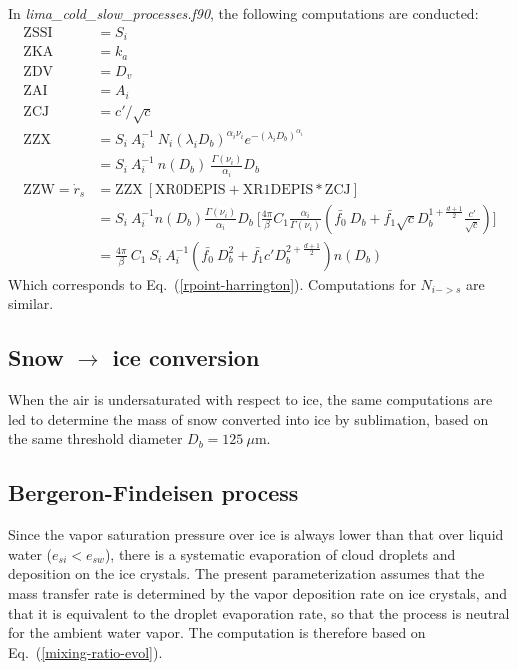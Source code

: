 {In \emph{lima\_cold\_slow\_processes.f90}, the following computations are conducted:
\begin{align}
 \mathrm{ZSSI} &= S_i \\
 \mathrm{ZKA} &= k_a \\
 \mathrm{ZDV} &= D_v \\
 \mathrm{ZAI} &= A_i \\
 \mathrm{ZCJ} &= c'/\sqrt{c} \\
 \mathrm{ZZX} &= S_i ~ A_i^{-1} ~ N_i (\lambda_iD_b)^{\alpha_i\nu_i} e^{-(\lambda_iD_b)^{\alpha_i}} \\
 &= S_i ~ A_i^{-1} ~ n(D_b) ~ \frac{\Gamma(\nu_i)}{\alpha_i} D_b \\
 \mathrm{ZZW} = \dot{r}_s &= \mathrm{ZZX} ~ [\mathrm{XR0DEPIS} + \mathrm{XR1DEPIS} * \mathrm{ZCJ}]  \\
 &= S_i~A_i^{-1} n(D_b) \frac{\Gamma(\nu_i)}{\alpha_i} D_b ~ \bigg[ \frac{4\pi}{\beta} C_1 \frac{\alpha_i}{\Gamma(\nu_i)} ( \bar{f_0} ~ D_b + \bar{f_1} \sqrt{c} D_b^{1+\frac{d+1}{2}} \frac{c'}{\sqrt{c}} ) \bigg] \\
 &= \frac{4\pi}{\beta} ~ C_1 ~ S_i~A_i^{-1} ( \bar{f_0} ~ D_b^2 + \bar{f_1} c' D_b^{2+\frac{d+1}{2}}) n(D_b)
 \end{align}
Which corresponds to Eq.\ (\ref{rpoint-harrington}). Computations for $N_{i->s}$ are similar.

\subsection{Snow $\rightarrow$ ice conversion}

When the air is undersaturated with respect to ice, the same computations are led to determine the mass of snow converted into ice by sublimation, based on the same threshold diameter $D_b = 125~\mu$m.

\subsection{Bergeron-Findeisen process}

Since the vapor saturation pressure over ice is always lower than that over liquid water ($e_{si} < e_{sw}$), there is a systematic evaporation of cloud droplets and deposition on the ice crystals. The present parameterization assumes that the mass transfer rate is determined by the vapor deposition rate on ice crystals, and that it is equivalent to the droplet evaporation rate, so that the process is neutral for the ambient water vapor. The computation is therefore based on Eq.\ (\ref{mixing-ratio-evol}).

}
